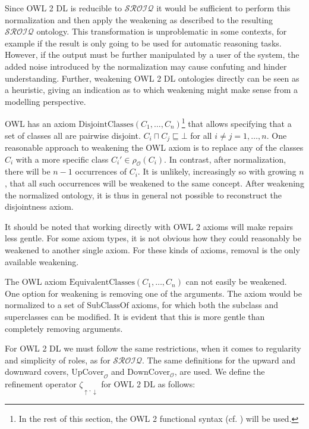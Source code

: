 Since OWL 2 DL is reducible to $\mathcal{SROIQ}$ it would be sufficient to perform this normalization and then apply the weakening as described to the resulting $\mathcal{SROIQ}$ ontology. This transformation is unproblematic in some contexts, for example if the result is only going to be used for automatic reasoning tasks. However, if the output must be further manipulated by a user of the system, the added noise introduced by the normalization may cause confuting and hinder understanding. Further, weakening OWL 2 DL ontologies directly can be seen as a heuristic, giving an indication as to which weakening might make sense from a modelling perspective.

\begin{example}
OWL has an axiom $\mathrm{DisjointClasses}(C_1, \dots, C_n)$\footnote{In the rest of this section, the OWL 2 functional syntax (cf. \cite{motik2009owl_spec}) will be used.} that allows specifying that a set of classes all are pairwise disjoint. $C_i \sqcap C_j \sqsubseteq \bot$ for all $i \not= j = 1, \dots, n$. One reasonable approach to weakening the OWL axiom is to replace any of the classes $C_i$ with a more specific class $C_i' \in \rho_\mathcal{O}(C_i)$. In contrast, after normalization, there will be $n - 1$ occurrences of $C_i$. It is unlikely, increasingly so with growing $n$, that all such occurrences will be weakened to the same concept. After weakening the normalized ontology, it is thus in general not possible to reconstruct the disjointness axiom.
\end{example}

It should be noted that working directly with OWL 2 axioms will make repairs less gentle. For some axiom types, it is not obvious how they could reasonably be weakened to another single axiom. For these kinds of axioms, removal is the only available weakening.

\begin{example}
The OWL axiom $\mathrm{EquivalentClasses}(C_1, \dots, C_n)$ can not easily be weakened. One option for weakening is removing one of the arguments. The axiom would be normalized to a set of $\mathrm{SubClassOf}$ axioms, for which both the subclass and superclasses can be modified. It is evident that this is more gentle than completely removing arguments.
\end{example}

For OWL 2 DL we must follow the same restrictions, when it comes to regularity and simplicity of roles, as for $\mathcal{SROIQ}$. The same definitions for the upward and downward covers, $\mathrm{UpCover}_\mathcal{O}$ and $\mathrm{DownCover}_\mathcal{O}$, are used. We define the refinement operator $\zeta_{\uparrow,\downarrow}$ for OWL 2 DL as follows:

